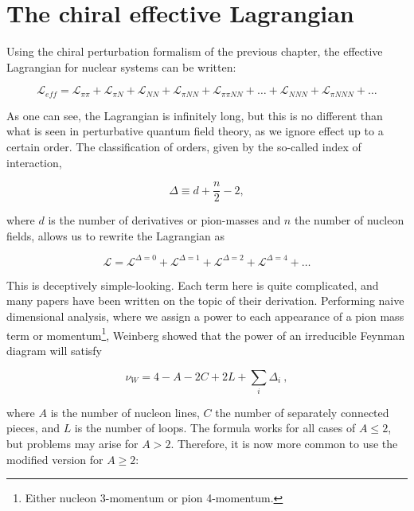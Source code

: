 \documentclass[10pt]{report}
\begin{document}
	\section{The chiral effective Lagrangian}
	Using the chiral perturbation formalism of the previous chapter, the effective Lagrangian for nuclear systems can be written:
	
	\begin{equation}
		\mathcal{L}_{eff} = \mathcal{L}_{\pi\pi} + \mathcal{L}_{\pi N} + \mathcal{L}_{NN} + \mathcal{L}_{\pi NN} + \mathcal{L}_{\pi\pi NN} + \ldots + \mathcal{L}_{NNN} + \mathcal{\mathcal{L}}_{\pi NNN} + \ldots
	\end{equation}
	
	As one can see, the Lagrangian is infinitely long, but this is no different than what is seen in perturbative quantum field theory, as we ignore effect up to a certain order. The classification of orders, given by the so-called index of interaction,
	
	\begin{equation}
		\Delta \equiv d + \frac{n}{2} - 2,
	\end{equation}
	
	where $d$ is the number of derivatives or pion-masses and $n$ the number of nucleon fields, allows us to rewrite the Lagrangian as
	
	\begin{equation}
		\mathcal{L} = \mathcal{L}^{\Delta = 0} + \mathcal{L}^{\Delta = 1} + \mathcal{L}^{\Delta = 2} + \mathcal{L}^{\Delta = 4} + \ldots
	\end{equation}
	
	This is deceptively simple-looking. Each term here is quite complicated, and many papers have been written on the topic of their derivation.  Performing naive dimensional analysis, where we assign a power to each appearance of a pion mass term or momentum\footnote{Either nucleon 3-momentum or pion 4-momentum.}, Weinberg showed that the power of an irreducible Feynman diagram will satisfy
	
	\begin{equation}
		\nu_W = 4-A-2C + 2L + \sum_i\Delta_i\:,
	\end{equation}
	
	where $A$ is the number of nucleon lines, $C$ the number of separately connected pieces, and $L$ is the number of loops. The formula works for all cases of $A\leq2$, but problems may arise for $A>2$. Therefore, it is now more common to use the modified version for $A\geq 2$:
	
\end{document}
